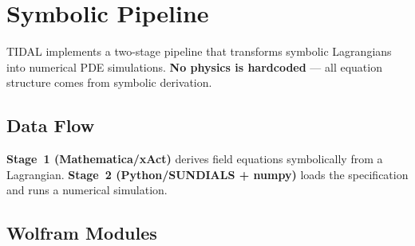 
\section{Symbolic Pipeline}
\label{sec:pipeline}

TIDAL implements a two-stage pipeline that transforms symbolic Lagrangians into numerical PDE simulations.
\textbf{No physics is hardcoded} --- all equation structure comes from symbolic derivation.

\subsection{Data Flow}

\begin{center}
\end{center}

\textbf{Stage~1 (Mathematica/xAct)} derives field equations symbolically from a Lagrangian.
\textbf{Stage~2 (Python/SUNDIALS + numpy)} loads the specification and runs a numerical simulation.

\subsection{Wolfram Modules}

